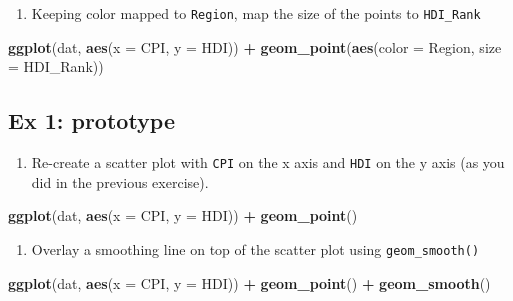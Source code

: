 \documentclass[]{book}
\newenvironment{Shaded}{\begin{snugshade}}{\end{snugshade}}
\newcommand{\DataTypeTok}[1]{\textcolor[rgb]{0.13,0.29,0.53}{#1}}
\newcommand{\KeywordTok}[1]{\textcolor[rgb]{0.13,0.29,0.53}{\textbf{#1}}}
\newcommand{\NormalTok}[1]{#1}
\newcommand{\OperatorTok}[1]{\textcolor[rgb]{0.81,0.36,0.00}{\textbf{#1}}}
\newcommand{\StringTok}[1]{\textcolor[rgb]{0.31,0.60,0.02}{#1}}
\providecommand{\tightlist}{%
  \setlength{\itemsep}{0pt}\setlength{\parskip}{0pt}}
\begin{document}
\begin{enumerate}
\def\labelenumi{\arabic{enumi}.}
\setcounter{enumi}{4}
\tightlist
\item
  Keeping color mapped to \texttt{Region}, map the size of the points to \texttt{HDI\_Rank}
\end{enumerate}

\begin{Shaded}
\begin{Highlighting}[]
\KeywordTok{ggplot}\NormalTok{(dat, }\KeywordTok{aes}\NormalTok{(}\DataTypeTok{x =}\NormalTok{ CPI, }\DataTypeTok{y =}\NormalTok{ HDI)) }\OperatorTok{+}
\KeywordTok{geom_point}\NormalTok{(}\KeywordTok{aes}\NormalTok{(}\DataTypeTok{color =}\NormalTok{ Region, }\DataTypeTok{size =}\NormalTok{  HDI_Rank))}
\end{Highlighting}
\end{Shaded}

\hypertarget{ex-1-prototype-2}{%
\subsection{Ex 1: prototype}\label{ex-1-prototype-2}}

\begin{enumerate}
\def\labelenumi{\arabic{enumi}.}
\tightlist
\item
  Re-create a scatter plot with \texttt{CPI} on the x axis and \texttt{HDI} on the y axis (as you did in the previous exercise).
\end{enumerate}

\begin{Shaded}
\begin{Highlighting}[]
\KeywordTok{ggplot}\NormalTok{(dat, }\KeywordTok{aes}\NormalTok{(}\DataTypeTok{x =}\NormalTok{ CPI, }\DataTypeTok{y =}\NormalTok{ HDI)) }\OperatorTok{+}
\StringTok{  }\KeywordTok{geom_point}\NormalTok{()}
\end{Highlighting}
\end{Shaded}

\begin{enumerate}
\def\labelenumi{\arabic{enumi}.}
\setcounter{enumi}{1}
\tightlist
\item
  Overlay a smoothing line on top of the scatter plot using \texttt{geom\_smooth()}
\end{enumerate}

\begin{Shaded}
\begin{Highlighting}[]
\KeywordTok{ggplot}\NormalTok{(dat, }\KeywordTok{aes}\NormalTok{(}\DataTypeTok{x =}\NormalTok{ CPI, }\DataTypeTok{y =}\NormalTok{ HDI)) }\OperatorTok{+}
\StringTok{  }\KeywordTok{geom_point}\NormalTok{() }\OperatorTok{+}
\StringTok{  }\KeywordTok{geom_smooth}\NormalTok{()}
\end{Highlighting}
\end{Shaded}
\end{document}

